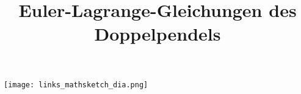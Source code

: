 \documentclass[a3paper, 12pt, landscape]{article}
\title{\fontsize{50pt}{120pt}\selectfont Euler-Lagrange-Gleichungen des Doppelpendels}
\author{ }
\date{ }
\newenvironment{Figure}
  {\par\medskip\noindent\minipage{\linewidth}}
  {\endminipage\par\medskip}
\begin{document}
\LARGE
\maketitle

\begin{multicols}{2}

\begin{Figure}
\centering
\texttt{[image: links\_mathsketch\_dia.png]}
\end{Figure}
\columnbreak


\end{multicols}
\end{document}
